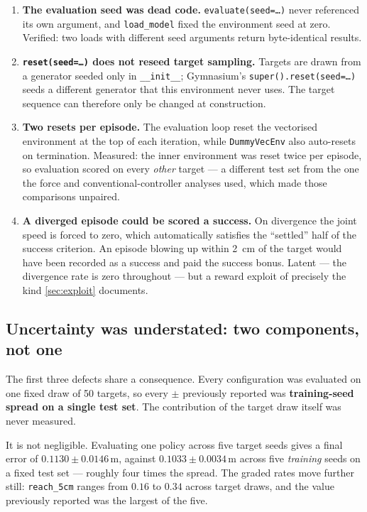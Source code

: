 \begin{enumerate}[leftmargin=1.5em, itemsep=3pt]
\item \textbf{The evaluation seed was dead code.} \texttt{evaluate(seed=\ldots)}
never referenced its own argument, and \texttt{load\_model} fixed the environment
seed at zero. Verified: two loads with different seed arguments return
byte-identical results.

\item \textbf{\texttt{reset(seed=\ldots)} does not reseed target sampling.}
Targets are drawn from a generator seeded only in \texttt{\_\_init\_\_};
Gymnasium's \texttt{super().reset(seed=\ldots)} seeds a different generator that
this environment never uses. The target sequence can therefore only be changed at
construction.

\item \textbf{Two resets per episode.} The evaluation loop reset the vectorised
environment at the top of each iteration, while \texttt{DummyVecEnv} also
auto-resets on termination. Measured: the inner environment was reset twice per
episode, so evaluation scored on every \emph{other} target --- a different test
set from the one the force and conventional-controller analyses used, which made
those comparisons unpaired.

\item \textbf{A diverged episode could be scored a success.} On divergence the
joint speed is forced to zero, which automatically satisfies the ``settled'' half
of the success criterion. An episode blowing up within \SI{2}{\centi\meter} of
the target would have been recorded as a success and paid the success bonus.
Latent --- the divergence rate is zero throughout --- but a reward exploit of
precisely the kind \cref{sec:exploit} documents.
\end{enumerate}

\subsection{Uncertainty was understated: two components, not one}
\label{sec:variance}

The first three defects share a consequence. Every configuration was evaluated on
one fixed draw of 50 targets, so every $\pm$ previously reported was
\textbf{training-seed spread on a single test set}. The contribution of the
target draw itself was never measured.

It is not negligible. Evaluating one policy across five target seeds gives a
final error of $0.1130 \pm 0.0146$\,m, against $0.1033 \pm 0.0034$\,m across five
\emph{training} seeds on a fixed test set --- roughly four times the spread. The
graded rates move further still: \texttt{reach\_5cm} ranges from $0.16$ to $0.34$
across target draws, and the value previously reported was the largest of the
five.

